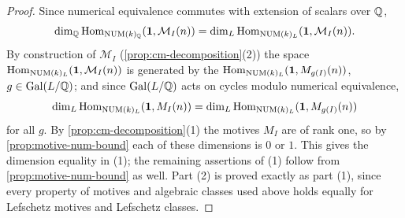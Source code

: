 \begin{proof}
  Since numerical equivalence commutes with extension of scalars over \(\mathbb{Q}\),
  \[\dim_{\mathbb{Q}} \mathrm{Hom}_{\mathrm{NUM}(k)_{\mathbb{Q}}}(\mathbf{1}, \mathcal{M}_I(n)) =
    \dim_L \mathrm{Hom}_{\mathrm{NUM}(k)_L}(\mathbf{1}, \mathcal{M}_I(n)).\]
  By construction of \(\mathcal{M}_I\) (\cref{prop:cm-decomposition}(2)) the space
  \(\mathrm{Hom}_{\mathrm{NUM}(k)_L}(\mathbf{1}, \mathcal{M}_I(n))\) is generated by the
  \(\mathrm{Hom}_{\mathrm{NUM}(k)_L}(\mathbf{1}, M_{g(I)}(n))\), \(g \in \mathrm{Gal}(L/\mathbb{Q})\); and since
  \(\mathrm{Gal}(L/\mathbb{Q})\) acts on cycles modulo numerical equivalence,
  \[\dim_L \mathrm{Hom}_{\mathrm{NUM}(k)_L}(\mathbf{1}, M_{I}(n)) =
    \dim_L \mathrm{Hom}_{\mathrm{NUM}(k)_L}(\mathbf{1}, M_{g(I)}(n))\]
  for all \(g\). By \cref{prop:cm-decomposition}(1) the motives \(M_I\) are of
  rank one, so by \cref{prop:motive-num-bound} each of these dimensions is \(0\)
  or \(1\). This gives the dimension equality in (1); the remaining assertions of
  (1) follow from \cref{prop:motive-num-bound} as well. Part (2) is proved
  exactly as part (1), since every property of motives and algebraic classes used
  above holds equally for Lefschetz motives and Lefschetz classes.
\end{proof}

